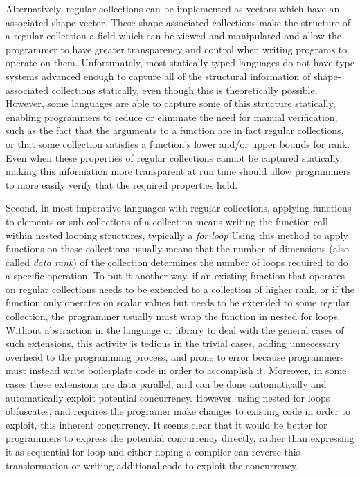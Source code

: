 Alternatively, regular collections can be implemented as vectors which have an associated shape vector. 
These shape-associated collections make the structure of a regular collection 
a field which can be viewed and manipulated and allow the programmer to have 
greater transparency and control when writing programs to operate on them.
Unfortunately, most statically-typed languages do not have type systems advanced enough 
to capture all of the structural information of shape-associated collections statically, 
even though this is theoretically possible. %
However, some languages are able to capture some of this structure statically\cite{boost}\cite{sac}\cite{dph}, 
enabling programmers to reduce or eliminate the need for manual verification, 
such as the fact that the arguments to a function are in fact regular collections,
or that some collection satisfies a function's lower and/or upper bounds for rank.
Even when these properties of regular collections cannot be captured statically, 
making this information more transparent at run time 
should allow programmers to more easily verify that the required properties hold.

Second, in most imperative languages with regular collections, 
applying functions to elements or sub-collections of a collection means 
writing the function call within nested looping structures, typically a \textit{for loop}
Using this method to apply functions on these collections usually means that 
the number of dimensions (also called \textit{data rank}) of the collection 
determines the number of loops required to do a specific operation.
To put it another way, if an existing function that operates on regular collections 
needs to be extended to a collection of higher rank, 
or if the function only operates on scalar values but needs to be extended to some regular collection, 
the programmer usually must wrap the function in nested for loops.
Without abstraction in the language or library to deal with the general cases of such extensions, 
this activity is tedious in the trivial cases, adding unnecessary overhead to the programming process,
and prone to error because programmers must instead write boilerplate code in order to accomplish it.
Moreover, in some cases these extensions are data parallel, 
and can be done automatically and automatically exploit potential concurrency.
However, using nested for loops obfuscates,
and requires the programer make changes to existing code in order to exploit, this inherent concurrency. 
It seems clear that it would be better for programmers to express the potential concurrency directly, 
rather than expressing it as sequential for loop and either hoping a compiler can reverse this transformation 
or writing additional code to exploit the concurrency.

